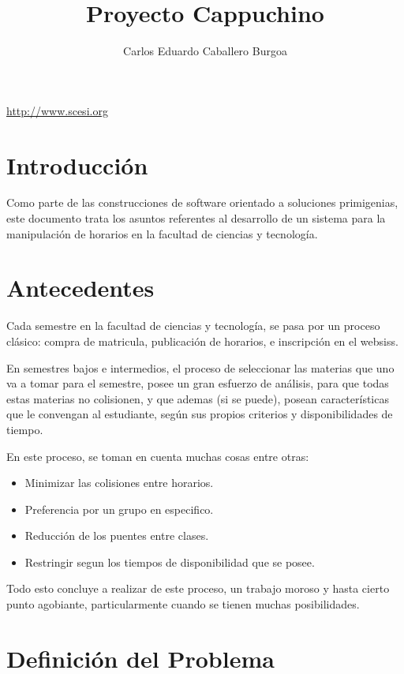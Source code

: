 \documentclass[letter,12pt]{article}
\title{\bf Proyecto Cappuchino}
\author{Carlos Eduardo Caballero Burgoa}
\begin{document}
\maketitle
\begin{center}\url {http://www.scesi.org}\end{center}
\pagebreak

\tableofcontents
\pagebreak

\section{Introducción}
Como parte de las construcciones de software orientado a soluciones primigenias, este documento
trata los asuntos referentes al desarrollo de un sistema para la manipulación de horarios en
la facultad de ciencias y tecnología.

\section{Antecedentes}
Cada semestre en la facultad de ciencias y tecnología, se pasa por un proceso clásico: compra de
matricula, publicación de horarios, e inscripción en el websiss.

En semestres bajos e intermedios, el proceso de seleccionar las materias que uno va a tomar para
el semestre, posee un gran esfuerzo de análisis, para que todas estas materias no colisionen, y que
ademas (si se puede), posean características que le convengan al estudiante, según sus propios criterios
y disponibilidades de tiempo.

En este proceso, se toman en cuenta muchas cosas entre otras:

\begin{itemize}
\item Minimizar las colisiones entre horarios.
\item Preferencia por un grupo en especifico.
\item Reducción de los puentes entre clases.
\item Restringir segun los tiempos de disponibilidad que se posee.
\end{itemize}

Todo esto concluye a realizar de este proceso, un trabajo moroso y hasta cierto punto agobiante,
particularmente cuando se tienen muchas posibilidades.

\section{Definición del Problema}
\end{document}
